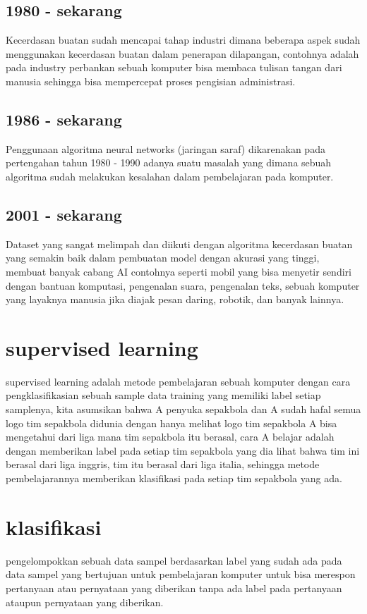 \subsection{1980 - sekarang}
\par Kecerdasan buatan sudah mencapai tahap industri dimana beberapa aspek sudah menggunakan kecerdasan buatan dalam penerapan dilapangan, contohnya adalah pada industry perbankan sebuah komputer bisa membaca tulisan tangan dari manusia sehingga bisa mempercepat proses pengisian administrasi.

\subsection{1986 - sekarang}
\par Penggunaan algoritma neural networks (jaringan saraf) dikarenakan pada pertengahan tahun 1980 - 1990 adanya suatu masalah yang dimana sebuah algoritma sudah melakukan kesalahan dalam pembelajaran pada komputer.

\subsection{2001 - sekarang}
\par Dataset yang sangat melimpah dan diikuti dengan algoritma kecerdasan buatan yang semakin baik dalam pembuatan model dengan akurasi yang tinggi, membuat banyak cabang AI contohnya seperti mobil yang bisa menyetir sendiri dengan bantuan komputasi, pengenalan suara, pengenalan teks, sebuah komputer yang layaknya manusia jika diajak pesan daring, robotik, dan banyak lainnya.

\section{supervised learning}
\par supervised learning adalah metode pembelajaran sebuah komputer dengan cara pengklasifikasian sebuah sample data training yang memiliki label setiap samplenya, kita asumsikan bahwa A penyuka sepakbola dan A sudah hafal semua logo tim sepakbola didunia dengan hanya melihat logo tim sepakbola A bisa mengetahui dari liga mana tim sepakbola itu berasal, cara A belajar adalah dengan memberikan label pada setiap tim sepakbola yang dia lihat bahwa tim ini berasal dari liga inggris, tim itu berasal dari liga italia, sehingga metode pembelajarannya memberikan klasifikasi pada setiap tim sepakbola yang ada.

\section{klasifikasi}
\par pengelompokkan sebuah data sampel berdasarkan label yang sudah ada pada data sampel yang bertujuan untuk pembelajaran komputer untuk bisa merespon pertanyaan atau pernyataan yang diberikan tanpa ada label pada pertanyaan ataupun pernyataan yang diberikan.

